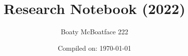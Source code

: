\documentclass[openany,onecolumn,oneside]{memoir}
\begin{document}

\title{Research Notebook (2022)}
\author{Boaty McBoatface 222}
\date{Compiled on: \today }
\maketitle
\clearpage



\begin{KeepFromToc}
    \tableofcontents
\end{KeepFromToc}

\newpage
\newpage
{}

%















\appendixpage
\label{appendixpage}
 
%
\onecolumn




{}





\renewcommand*{\bibfont}{\footnotesize}

%
%

\printbibliography{}
\end{document}
